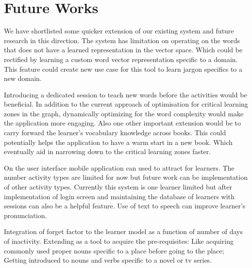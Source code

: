 \documentclass[11pt,a4paper]{article}
\begin{document}
\section{Future Works}
We have shortlisted some quicker extension of our existing system and future research in this direction. 
The system has limitation on operating on the words that does not have a learned
representation in the vector space. Which could be rectified by learning a
custom word vector representation specific to a domain. This feature could create new use case
for this tool to learn jargon specifics to a new domain.

Introducing a dedicated session to teach new words before the activities would be beneficial.
In addition to the current approach of optimisation for critical learning zones in the graph,
dynamically optimizing for the word complexity would make the application more engaging.
Also one other important extension would be to carry forward the learner's vocabulary knowledge across books.
This could potentially helps the application to have a warm start in a new book. Which eventually
aid in narrowing down to the critical learning zones faster.

On the user interface mobile application can used to attract for learners. The number activity types are limited for now but future work can be implementation of other activity types. Currently this system is one learner limited but after implementation of login screen and maintaining the database of learners with sessions can also be a helpful feature. Use of text to speech can improve learner's pronunciation. 

Integration of forget factor to the learner model as a function of number of days of inactivity.
Extending as a tool to acquire the pre-requisites: Like acquiring commonly used proper nouns specific to a place before going to the place; Getting introduced to nouns and verbs specific to a novel or tv series.




\end{document}
